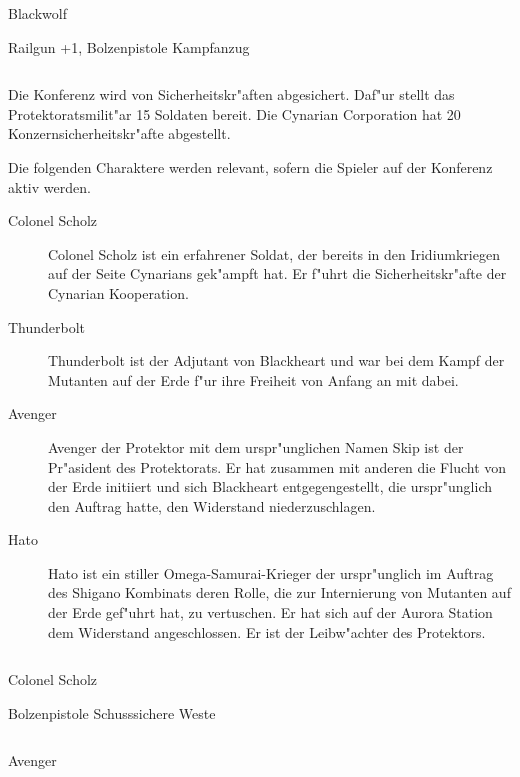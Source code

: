 \begin{column}[l]{0.45}
    \begin{nscsheet}[h]{Blackwolf}
        \nscstats[ATT=2,AGG=3,CON=2]
        \nscruler
        \begin{nscinventory}
            \nscitem[Waffen] Railgun +1, Bolzenpistole
            \nscitem[R"ustung] Kampfanzug
        \end{nscinventory}
    \end{nscsheet}    
\end{column}
\begin{column}[r]{0.45}

\end{column}


Die Konferenz wird von Sicherheitskr"aften abgesichert. Daf"ur stellt das Protektoratsmilit"ar 15 Soldaten bereit. Die 
Cynarian Corporation hat 20 Konzernsicherheitskr"afte abgestellt.

Die folgenden Charaktere werden relevant, sofern die Spieler auf der Konferenz aktiv werden.

\begin{description}
    \item[Colonel Scholz] Colonel Scholz ist ein erfahrener Soldat, der bereits in den Iridiumkriegen auf der Seite Cynarians gek"ampft hat. 
        Er f"uhrt die Sicherheitskr"afte der Cynarian Kooperation.
    \item[Thunderbolt] Thunderbolt ist der Adjutant von Blackheart und war bei dem Kampf der Mutanten auf der Erde f"ur ihre Freiheit von 
        Anfang an mit dabei.
    \item[Avenger] Avenger der Protektor mit dem urspr"unglichen Namen Skip ist der Pr"asident des Protektorats. Er hat zusammen mit anderen 
        die Flucht von der Erde initiiert und sich Blackheart entgegengestellt, die urspr"unglich den Auftrag hatte, den Widerstand niederzuschlagen.
    \item[Hato] Hato ist ein stiller Omega-Samurai-Krieger der urspr"unglich im Auftrag des Shigano Kombinats deren Rolle, die zur 
        Internierung von Mutanten auf der Erde gef"uhrt hat, zu vertuschen. Er hat sich auf der Aurora Station dem Widerstand angeschlossen. Er ist der Leibw"achter des Protektors.
\end{description}

\begin{column}[l]{0.45}
    \begin{nscsheet}[h]{Colonel Scholz}
        \nscstats[ATT=2,AGG=2,COM=3]
        \nscruler
        \begin{nscinventory}
            \nscitem[Waffen] Bolzenpistole
            \nscitem[R"ustung] Schusssichere Weste
        \end{nscinventory}
    \end{nscsheet}
\end{column}
\begin{column}[r]{0.45}
    \begin{nscsheet}[h]{Avenger}
        \nscstats[ATT=2,AGG=2,DEX=2,COM=3,CON=2]
        \nscruler
    \end{nscsheet}
\end{column}
\vfill\pagebreak

